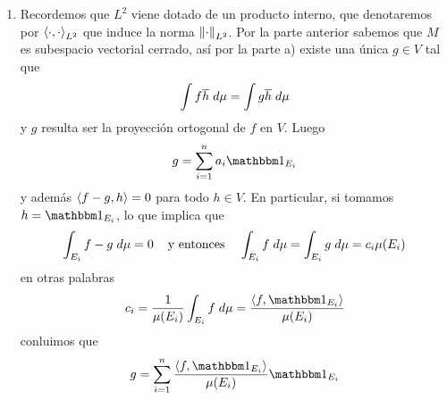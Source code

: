 \documentclass{article}
\begin{document}
\begin{enumerate}
    \item Recordemos que $L^2$ viene dotado de un producto interno, que denotaremos por 
    $\left\langle{\cdot},{\cdot}\right\rangle_{L^{2}}$ que induce la norma $\left \lVert \cdot\right \rVert_{L^{2}}$. Por la parte anterior 
    sabemos que $M$ es subespacio vectorial cerrado, así por la parte a) existe una única $g\in V$ 
    tal que
    \begin{equation*}
        \int f\overline{h}\hspace{1mm}d\mu=\int g\overline{h}\hspace{1mm}d\mu
    \end{equation*}
    y $g$ resulta ser la proyección ortogonal de $f$ en $V$. Luego
    \begin{equation*}
        g=\sum_{i=1}^{n} a_{i}\I_{E_{i}}
    \end{equation*}
    y además $\left\langle{f-g},{h}\right\rangle=0$ para todo $h\in V$. En particular, si tomamos $h=\I_{E_{i}}$, lo que
    implica que
    \begin{equation*}
        \int_{E_{i}}f-g\hspace{1mm}d\mu=0
        \hspace{4mm}\text{y entonces}\hspace{4mm}
        \int_{E_{i}}f\hspace{1mm}d\mu=\int_{E_{i}}g\hspace{1mm}d\mu=c_{i}\mu(E_{i})
    \end{equation*}
    en otras palabras
    \begin{equation*}
        c_{i}=\frac{1}{\mu(E_{i})}\int_{E_{i}}f\hspace{1mm}d\mu
        =\frac{\ip{f}{\I_{E_{i}}}}{\mu(E_{i})}
    \end{equation*}
    conluimos que
    \begin{equation*}
        g=\sum_{i=1}^{n}\frac{\ip{f}{\I_{E_{i}}}}{\mu(E_{i})}\I_{E_{i}}
    \end{equation*}

\end{enumerate}
\end{document}
